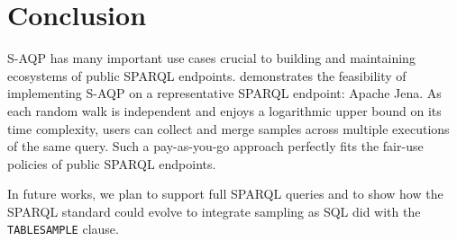 
\section{Conclusion}

S-AQP has many important use cases crucial to building and maintaining ecosystems of public SPARQL endpoints.
%
\NAME demonstrates the feasibility of implementing S-AQP on a
representative SPARQL endpoint: Apache Jena.  As each random walk is
independent and enjoys a logarithmic upper bound on its time
complexity, users can collect and merge samples across multiple
executions of the same query. Such a pay-as-you-go approach perfectly
fits the fair-use policies of public SPARQL endpoints.

\noindent In future works, we plan to support full SPARQL queries and
to show how the SPARQL standard could evolve to integrate sampling as
SQL did with the \verb|TABLESAMPLE| clause.
